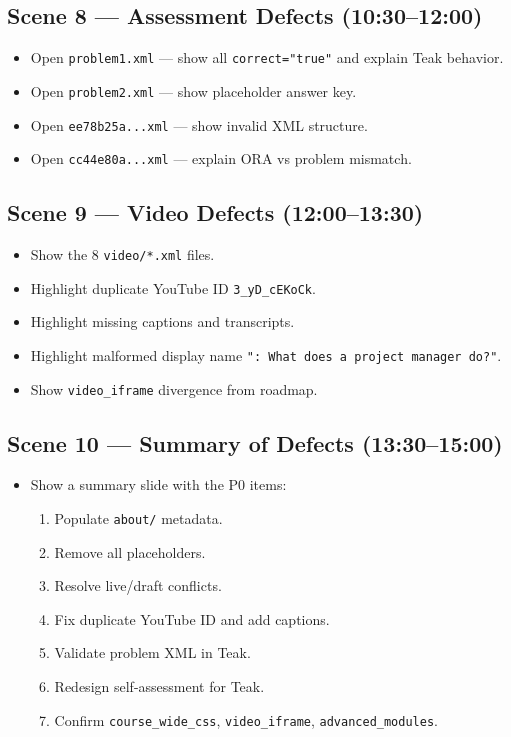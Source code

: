 \subsection*{Scene 8 — Assessment Defects (10:30--12:00)}
\begin{itemize}
  \item Open \texttt{problem1.xml} — show all \texttt{correct="true"} and explain Teak behavior.
  \item Open \texttt{problem2.xml} — show placeholder answer key.
  \item Open \texttt{ee78b25a...xml} — show invalid XML structure.
  \item Open \texttt{cc44e80a...xml} — explain ORA vs problem mismatch.
\end{itemize}

\subsection*{Scene 9 — Video Defects (12:00--13:30)}
\begin{itemize}
  \item Show the 8 \texttt{video/*.xml} files.
  \item Highlight duplicate YouTube ID \texttt{3\_yD\_cEKoCk}.
  \item Highlight missing captions and transcripts.
  \item Highlight malformed display name \texttt{": What does a project manager do?"}.
  \item Show \texttt{video\_iframe} divergence from roadmap.
\end{itemize}

\subsection*{Scene 10 — Summary of Defects (13:30--15:00)}
\begin{itemize}
  \item Show a summary slide with the P0 items:
    \begin{enumerate}
      \item Populate \texttt{about/} metadata.
      \item Remove all placeholders.
      \item Resolve live/draft conflicts.
      \item Fix duplicate YouTube ID and add captions.
      \item Validate problem XML in Teak.
      \item Redesign self-assessment for Teak.
      \item Confirm \texttt{course\_wide\_css}, \texttt{video\_iframe}, \texttt{advanced\_modules}.
    \end{enumerate}
\end{itemize}

